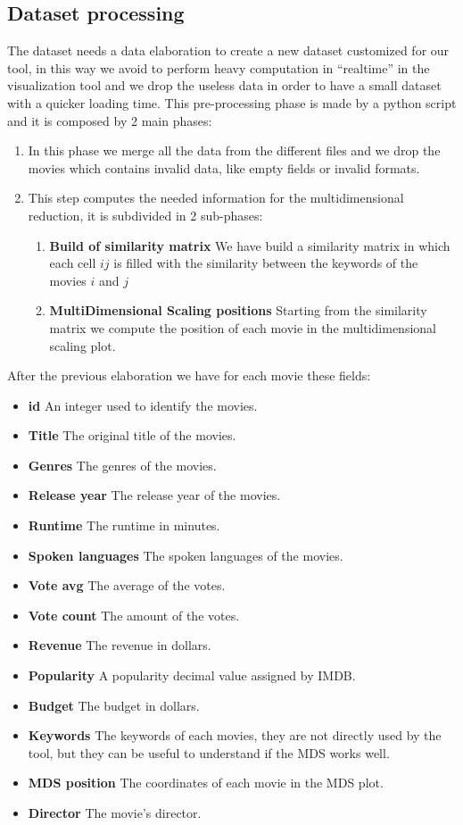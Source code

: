 \documentclass[]{article}
\newcommand{\quotes}[1]{``#1''}
\begin{document}
\subsection{Dataset processing}
The dataset needs a data elaboration to create a new dataset customized for our tool, in this way we avoid to perform heavy computation in \quotes{realtime} in the visualization tool and we drop the useless data in order to have a small dataset with a quicker loading time.\newline
This pre-processing phase is made by a python script and it is composed by 2 main phases:
\begin{enumerate}
	\item In this phase we merge all the data from the different files and we drop the movies which contains invalid data, like empty fields or invalid formats.
	\item This step computes the needed information for the multidimensional reduction, it is subdivided in 2 sub-phases:
	\begin{enumerate}
		\item \textbf{Build of similarity matrix}\newline
		 We have build a similarity matrix in which each cell $ij$ is filled with the similarity between the keywords of the movies $i$ and $j$
		\item \textbf{MultiDimensional Scaling positions}\newline
		Starting from the similarity matrix we compute the position of each movie in the multidimensional scaling plot.
	\end{enumerate}
\end{enumerate}
After the previous elaboration we have for each movie these fields:
\begin{itemize}
	\item \textbf{id} An integer used to identify the movies.
	\item \textbf{Title} The original title of the movies.
	\item \textbf{Genres} The genres of the movies.
	\item \textbf{Release year} The release year of the movies.
	\item \textbf{Runtime} The runtime in minutes.
	\item \textbf{Spoken languages} The spoken languages of the movies.
	\item \textbf{Vote avg} The average of the votes.
	\item \textbf{Vote count} The amount of the votes.
	\item \textbf{Revenue} The revenue in dollars.
	\item \textbf{Popularity} A popularity decimal value assigned by IMDB.
	\item \textbf{Budget} The budget in dollars.
	\item \textbf{Keywords}	The keywords of each movies, they are not directly used by the tool, but they can be useful to understand if the MDS works well.
	\item \textbf{MDS position} The coordinates of each movie in the MDS plot.
	\item \textbf{Director} The movie's director.
\end{itemize}
\end{document}
